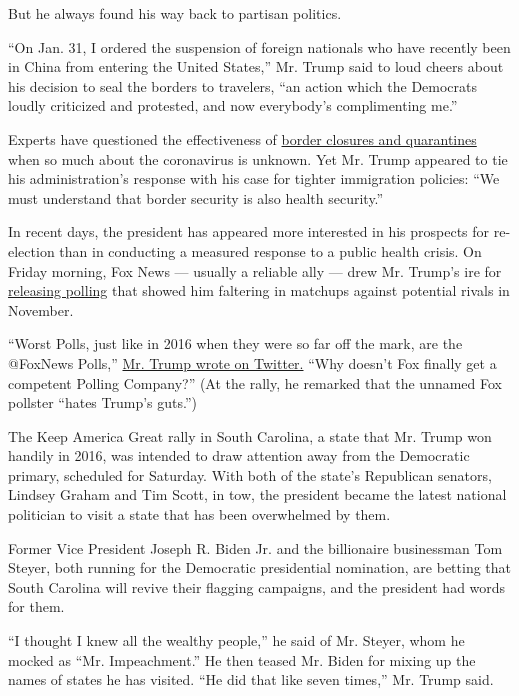 But he always found his way back to partisan politics.

``On Jan. 31, I ordered the suspension of foreign nationals who have
recently been in China from entering the United States,'' Mr. Trump said
to loud cheers about his decision to seal the borders to travelers, ``an
action which the Democrats loudly criticized and protested, and now
everybody's complimenting me.''

Experts have questioned the effectiveness of
\href{https://www.nytimes3xbfgragh.onion/interactive/2020/world/asia/china-coronavirus-contain.html}{border
closures and quarantines} when so much about the coronavirus is unknown.
Yet Mr. Trump appeared to tie his administration's response with his
case for tighter immigration policies: ``We must understand that border
security is also health security.''

In recent days, the president has appeared more interested in his
prospects for re-election than in conducting a measured response to a
public health crisis. On Friday morning, Fox News --- usually a reliable
ally --- drew Mr. Trump's ire for
\href{https://www.foxnews.com/politics/fox-news-poll-sanders-knocks-biden-out-of-first-majority-thinks-trump-wins}{releasing
polling} that showed him faltering in matchups against potential rivals
in November.

``Worst Polls, just like in 2016 when they were so far off the mark, are
the @FoxNews Polls,''
\href{https://twitter.com/realdonaldtrump/status/1233412547958755329}{Mr.
Trump wrote on Twitter.} ``Why doesn't Fox finally get a competent
Polling Company?'' (At the rally, he remarked that the unnamed Fox
pollster ``hates Trump's guts.'')

The Keep America Great rally in South Carolina, a state that Mr. Trump
won handily in 2016, was intended to draw attention away from the
Democratic primary, scheduled for Saturday. With both of the state's
Republican senators, Lindsey Graham and Tim Scott, in tow, the president
became the latest national politician to visit a state that has been
overwhelmed by them.

Former Vice President Joseph R. Biden Jr. and the billionaire
businessman Tom Steyer, both running for the Democratic presidential
nomination, are betting that South Carolina will revive their flagging
campaigns, and the president had words for them.

``I thought I knew all the wealthy people,'' he said of Mr. Steyer, whom
he mocked as ``Mr. Impeachment.'' He then teased Mr. Biden for mixing up
the names of states he has visited. ``He did that like seven times,''
Mr. Trump said.

